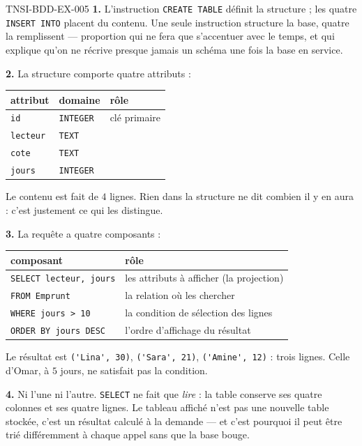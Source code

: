\begin{corrige}{TNSI-BDD-EX-005}
\textbf{1.} L'instruction \lstinline{CREATE TABLE} définit la structure ; les
quatre \lstinline{INSERT INTO} placent du contenu. Une seule instruction
structure la base, quatre la remplissent — proportion qui ne fera que s'accentuer
avec le temps, et qui explique qu'on ne récrive presque jamais un schéma une fois
la base en service.

\textbf{2.} La structure comporte quatre attributs :

\begin{center}
\begin{tabular}{lll}
\hline
attribut & domaine & rôle \\
\hline
\lstinline{id} & \lstinline{INTEGER} & clé primaire \\
\lstinline{lecteur} & \lstinline{TEXT} & \\
\lstinline{cote} & \lstinline{TEXT} & \\
\lstinline{jours} & \lstinline{INTEGER} & \\
\hline
\end{tabular}
\end{center}

Le contenu est fait de $4$ lignes. Rien dans la structure ne dit combien il y en
aura : c'est justement ce qui les distingue.

\textbf{3.} La requête a quatre composants :
\begin{center}
\begin{tabular}{ll}
\hline
composant & rôle \\
\hline
\lstinline{SELECT lecteur, jours} & les attributs à afficher (la projection) \\
\lstinline{FROM Emprunt} & la relation où les chercher \\
\lstinline{WHERE jours > 10} & la condition de sélection des lignes \\
\lstinline{ORDER BY jours DESC} & l'ordre d'affichage du résultat \\
\hline
\end{tabular}
\end{center}
Le résultat est
\lstinline{('Lina', 30)}, \lstinline{('Sara', 21)}, \lstinline{('Amine', 12)} :
trois lignes. Celle d'Omar, à $5$ jours, ne satisfait pas la condition.

\textbf{4.} Ni l'une ni l'autre. \lstinline{SELECT} ne fait que \emph{lire} : la
table conserve ses quatre colonnes et ses quatre lignes. Le tableau affiché n'est
pas une nouvelle table stockée, c'est un résultat calculé à la demande — et c'est
pourquoi il peut être trié différemment à chaque appel sans que la base bouge.


\end{corrige}
